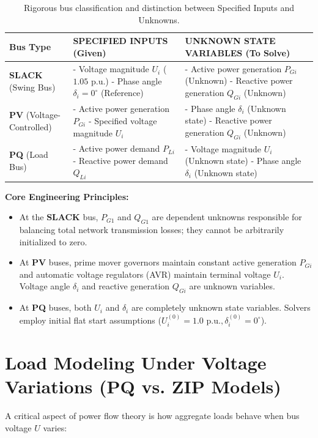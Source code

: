 \documentclass[12pt,a4paper,oneside]{report}
\begin{document}
\begin{table}[H]
\centering
\caption{Rigorous bus classification and distinction between Specified Inputs and Unknowns.}
\label{tab:bus_classification}
\begin{tabularx}{\textwidth}{lXX}
\toprule
\textbf{Bus Type} & \textbf{SPECIFIED INPUTS (Given)} & \textbf{UNKNOWN STATE VARIABLES (To Solve)} \\
\midrule
\textbf{SLACK} (Swing Bus) & 
- Voltage magnitude $U_i$ ($1.05\text{ p.u.}$) \newline
- Phase angle $\delta_i = 0^\circ$ (Reference) & 
- Active power generation $P_{Gi}$ (Unknown) \newline
- Reactive power generation $Q_{Gi}$ (Unknown) \\
\midrule
\textbf{PV} (Voltage-Controlled) & 
- Active power generation $P_{Gi}$ \newline
- Specified voltage magnitude $U_i$ & 
- Phase angle $\delta_i$ (Unknown state) \newline
- Reactive power generation $Q_{Gi}$ (Unknown) \\
\midrule
\textbf{PQ} (Load Bus) & 
- Active power demand $P_{Li}$ \newline
- Reactive power demand $Q_{Li}$ & 
- Voltage magnitude $U_i$ (Unknown state) \newline
- Phase angle $\delta_i$ (Unknown state) \\
\bottomrule
\end{tabularx}
\end{table}

\noindent \textbf{Core Engineering Principles:}
\begin{itemize}
    \item At the \textbf{SLACK} bus, $P_{G1}$ and $Q_{G1}$ are dependent unknowns responsible for balancing total network transmission losses; they cannot be arbitrarily initialized to zero.
    \item At \textbf{PV} buses, prime mover governors maintain constant active generation $P_{Gi}$ and automatic voltage regulators (AVR) maintain terminal voltage $U_i$. Voltage angle $\delta_i$ and reactive generation $Q_{Gi}$ are unknown variables.
    \item At \textbf{PQ} buses, both $U_i$ and $\delta_i$ are completely unknown state variables. Solvers employ initial flat start assumptions ($U_i^{(0)} = 1.0\text{ p.u.}, \delta_i^{(0)} = 0^\circ$).
\end{itemize}

\section{Load Modeling Under Voltage Variations (PQ vs. ZIP Models)}
A critical aspect of power flow theory is how aggregate loads behave when bus voltage $U$ varies:
\end{document}
